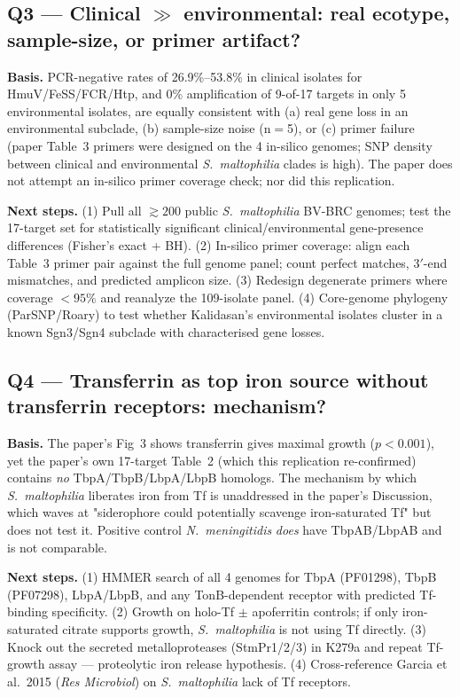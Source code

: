 \subsection*{Q3 --- Clinical $\gg$ environmental: real ecotype, sample-size, or primer artifact?}
\textbf{Basis.} PCR-negative rates of 26.9\%--53.8\% in clinical isolates for
HmuV/FeSS/FCR/Htp, and 0\% amplification of 9-of-17 targets in only 5
environmental isolates, are equally consistent with (a) real gene loss in an
environmental subclade, (b) sample-size noise (n$=$5), or (c) primer failure
(paper Table~3 primers were designed on the 4 in-silico genomes; SNP density
between clinical and environmental \textit{S.\ maltophilia} clades is high).
The paper does not attempt an in-silico primer coverage check; nor did this
replication.

\textbf{Next steps.} (1) Pull all $\gtrsim 200$ public \textit{S.\ maltophilia}
BV-BRC genomes; test the 17-target set for statistically significant
clinical/environmental gene-presence differences (Fisher's exact + BH).
(2) In-silico primer coverage: align each Table~3 primer pair against the
full genome panel; count perfect matches, 3$'$-end mismatches, and predicted
amplicon size. (3) Redesign degenerate primers where coverage $<95\%$ and
reanalyze the 109-isolate panel. (4) Core-genome phylogeny (ParSNP/Roary) to
test whether Kalidasan's environmental isolates cluster in a known Sgn3/Sgn4
subclade with characterised gene losses.

\subsection*{Q4 --- Transferrin as top iron source without transferrin receptors: mechanism?}
\textbf{Basis.} The paper's Fig~3 shows transferrin gives maximal growth
($p<0.001$), yet the paper's own 17-target Table~2 (which this replication
re-confirmed) contains \emph{no} TbpA/TbpB/LbpA/LbpB homologs. The mechanism
by which \textit{S.\ maltophilia} liberates iron from Tf is unaddressed
in the paper's Discussion, which waves at "siderophore could potentially
scavenge iron-saturated Tf" but does not test it. Positive control
\textit{N.\ meningitidis} \emph{does} have TbpAB/LbpAB and is not comparable.

\textbf{Next steps.} (1) HMMER search of all 4 genomes for TbpA (PF01298),
TbpB (PF07298), LbpA/LbpB, and any TonB-dependent receptor with predicted
Tf-binding specificity. (2) Growth on holo-Tf $\pm$ apoferritin controls;
if only iron-saturated citrate supports growth, \textit{S.\ maltophilia} is
not using Tf directly. (3) Knock out the secreted metalloproteases (StmPr1/2/3)
in K279a and repeat Tf-growth assay --- proteolytic iron release hypothesis.
(4) Cross-reference Garcia et al.\ 2015 (\textit{Res Microbiol}) on
\textit{S.\ maltophilia} lack of Tf receptors.

